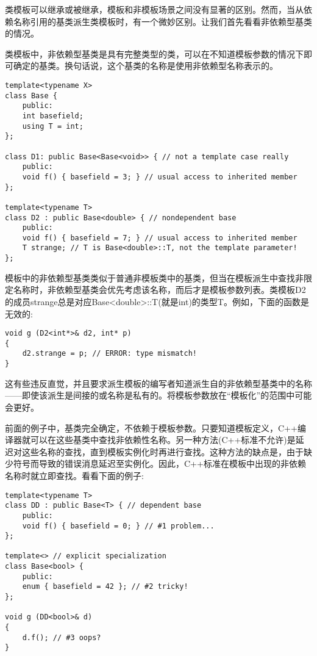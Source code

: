 
类模板可以继承或被继承，模板和非模板场景之间没有显著的区别。然而，当从依赖名称引用的基类派生类模板时，有一个微妙区别。让我们首先看看非依赖型基类的情况。


类模板中，非依赖型基类是具有完整类型的类，可以在不知道模板参数的情况下即可确定的基类。换句话说，这个基类的名称是使用非依赖型名称表示的。

\begin{lstlisting}[style=styleCXX]
template<typename X>
class Base {
	public:
	int basefield;
	using T = int;
};

class D1: public Base<Base<void>> { // not a template case really
	public:
	void f() { basefield = 3; } // usual access to inherited member
};

template<typename T>
class D2 : public Base<double> { // nondependent base
	public:
	void f() { basefield = 7; } // usual access to inherited member
	T strange; // T is Base<double>::T, not the template parameter!
};
\end{lstlisting}

模板中的非依赖型基类类似于普通非模板类中的基类，但当在模板派生中查找非限定名称时，非依赖型基类会优先考虑该名称，而后才是模板参数列表。类模板D2的成员strange总是对应Base<double>::T(就是int)的类型T。例如，下面的函数是无效的:

\begin{lstlisting}[style=styleCXX]
void g (D2<int*>& d2, int* p)
{
	d2.strange = p; // ERROR: type mismatch!
}
\end{lstlisting}

这有些违反直觉，并且要求派生模板的编写者知道派生自的非依赖型基类中的名称——即使该派生是间接的或名称是私有的。将模板参数放在“模板化”的范围中可能会更好。


前面的例子中，基类完全确定，不依赖于模板参数。只要知道模板定义，C++编译器就可以在这些基类中查找非依赖性名称。另一种方法(C++标准不允许)是延迟对这些名称的查找，直到模板实例化时再进行查找。这种方法的缺点是，由于缺少符号而导致的错误消息延迟至实例化。因此，C++标准在模板中出现的非依赖名称时就立即查找。看看下面的例子:

\begin{lstlisting}[style=styleCXX]
template<typename T>
class DD : public Base<T> { // dependent base
	public:
	void f() { basefield = 0; } // #1 problem...
};

template<> // explicit specialization
class Base<bool> {
	public:
	enum { basefield = 42 }; // #2 tricky!
};

void g (DD<bool>& d)
{
	d.f(); // #3 oops?
}
\end{lstlisting}

